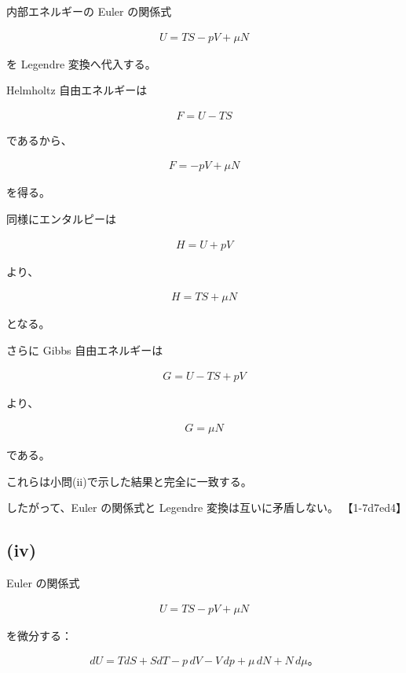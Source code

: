 \documentclass[platex,dvipdfmx,a4paper]{jsarticle}
\begin{document}
内部エネルギーの Euler の関係式

\begin{align*}
U
=
TS-pV+\mu N
\end{align*}

を Legendre 変換へ代入する。

Helmholtz 自由エネルギーは

\begin{align*}
F
=
U-TS
\end{align*}

であるから、

\begin{align*}
F
=
-pV+\mu N
\end{align*}

を得る。

同様にエンタルピーは

\begin{align*}
H
=
U+pV
\end{align*}

より、

\begin{align*}
H
=
TS+\mu N
\end{align*}

となる。

さらに Gibbs 自由エネルギーは

\begin{align*}
G
=
U-TS+pV
\end{align*}

より、

\begin{align*}
G
=
\mu N
\end{align*}

である。

これらは小問(ii)で示した結果と完全に一致する。

したがって、Euler の関係式と Legendre 変換は互いに矛盾しない。 【1-7d7ed4】

\subsection{(iv)}

Euler の関係式

\begin{align*}
U
=
TS-pV+\mu N
\end{align*}

を微分する：

\begin{align*}
dU
=
TdS+SdT-p\,dV-V\,dp+\mu\,dN+N\,d\mu。
\end{align*}
\end{document}
